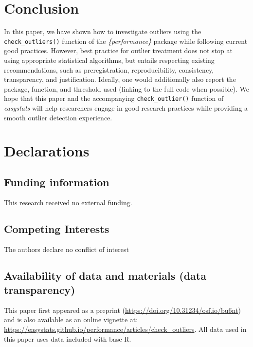 \documentclass[sn-basic, lineno,pdflatex]{sn-jnl}
\begin{document}
\section{Conclusion}\label{conclusion}

In this paper, we have shown how to investigate outliers using the
\texttt{check\_outliers()} function of the \emph{\{performance\}}
package while following current good practices. However, best practice
for outlier treatment does not stop at using appropriate statistical
algorithms, but entails respecting existing recommendations, such as
preregistration, reproducibility, consistency, transparency, and
justification. Ideally, one would additionally also report the package,
function, and threshold used (linking to the full code when possible).
We hope that this paper and the accompanying \texttt{check\_outlier()}
function of \emph{easystats} will help researchers engage in good
research practices while providing a smooth outlier detection
experience.

\section{Declarations}\label{declarations}

\subsection{Funding information}\label{funding-information}

This research received no external funding.

\subsection{Competing Interests}\label{competing-interests}

The authors declare no conflict of interest

\subsection{Availability of data and materials (data
transparency)}\label{availability-of-data-and-materials-data-transparency}

This paper first appeared as a preprint
(\url{https://doi.org/10.31234/osf.io/bu6nt}) and is also available as
an online vignette at:
\url{https://easystats.github.io/performance/articles/check_outliers}.
All data used in this paper uses data included with base R.
\end{document}
